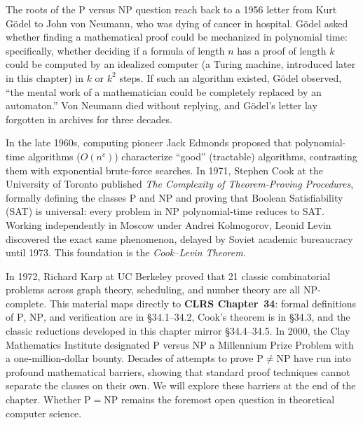 \begin{historybox}
The roots of the $\mathrm{P}$ versus $\mathrm{NP}$ question reach back to a
1956 letter from Kurt G\"odel to John von Neumann, who was dying of cancer
in hospital. G\"odel asked whether finding a mathematical proof could be mechanized
in polynomial time: specifically, whether deciding if a formula of length $n$ has a
proof of length $k$ could be computed by an idealized computer (a Turing machine, introduced later in this chapter) in $k$ or $k^2$ steps.
If such an algorithm existed, G\"odel observed, ``the
mental work of a mathematician could be completely replaced by an automaton.''
Von Neumann died without replying, and G\"odel's letter lay forgotten in archives
for three decades.

In the late 1960s, computing pioneer Jack Edmonds proposed that polynomial-time
algorithms ($O(n^c)$) characterize ``good'' (tractable) algorithms, contrasting
them with exponential brute-force searches. In 1971, Stephen Cook at the University
of Toronto published \emph{The Complexity of Theorem-Proving Procedures}, formally
defining the classes $\mathrm{P}$ and $\mathrm{NP}$ and proving that Boolean
Satisfiability (\textsc{SAT}) is universal: every problem in $\mathrm{NP}$
polynomial-time reduces to \textsc{SAT}. Working independently in Moscow under
Andrei Kolmogorov, Leonid Levin discovered the exact same phenomenon, delayed by
Soviet academic bureaucracy until 1973. This foundation is the \emph{Cook--Levin Theorem}.

In 1972, Richard Karp at UC Berkeley proved that 21 classic combinatorial
problems across graph theory, scheduling, and number theory are all NP-complete.
This material maps directly to \textbf{CLRS Chapter~34}: formal definitions of
$\mathrm{P}$, $\mathrm{NP}$, and verification are in \S34.1--34.2, Cook's theorem
is in \S34.3, and the classic reductions developed in this chapter mirror
\S34.4--34.5. In 2000, the Clay Mathematics Institute designated $\mathrm{P}$
versus $\mathrm{NP}$ a Millennium Prize Problem with a one-million-dollar bounty.
Decades of attempts to prove $\mathrm{P} \neq \mathrm{NP}$ have run into profound mathematical barriers, showing that standard proof techniques cannot separate the classes on their own. We will explore these barriers at the end of the chapter. Whether $\mathrm{P} = \mathrm{NP}$ remains the foremost open
question in theoretical computer science.
\end{historybox}

\chapterline

